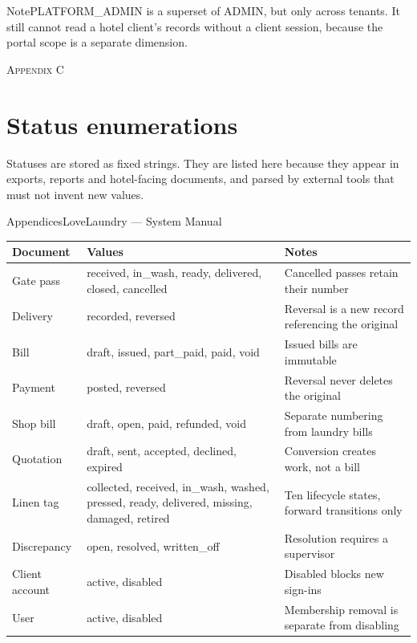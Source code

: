 \documentclass[11pt,a4paper,oneside]{book}
\begin{document}
\begin{notebox}NotePLATFORM\_ADMIN is a superset of ADMIN, but only across tenants. It still cannot read a hotel client's records without a client session, because the portal scope is a separate dimension.\end{notebox}
\textsc{\small\color{crimson}Appendix C}\par\medskip
\section*{Status enumerations}
Statuses are stored as fixed strings. They are listed here because they appear in exports, reports and hotel-facing documents, and parsed by external tools that must not invent new values.

AppendicesLoveLaundry — System Manual

\begin{center}\small
\begin{tabularx}{\linewidth}{|X|X|X|}
\hline
\rowcolor{lightgrey}
\textbf{Document} & \textbf{Values} & \textbf{Notes} \\ \hline
Gate pass & received, in\_wash, ready, delivered, closed, cancelled & Cancelled passes retain their number \\ \hline
Delivery & recorded, reversed & Reversal is a new record referencing the original \\ \hline
Bill & draft, issued, part\_paid, paid, void & Issued bills are immutable \\ \hline
Payment & posted, reversed & Reversal never deletes the original \\ \hline
Shop bill & draft, open, paid, refunded, void & Separate numbering from laundry bills \\ \hline
Quotation & draft, sent, accepted, declined, expired & Conversion creates work, not a bill \\ \hline
Linen tag & collected, received, in\_wash, washed, pressed, ready, delivered, missing, damaged, retired & Ten lifecycle states, forward transitions only \\ \hline
Discrepancy & open, resolved, written\_off & Resolution requires a supervisor \\ \hline
Client account & active, disabled & Disabled blocks new sign-ins \\ \hline
User & active, disabled & Membership removal is separate from disabling \\ \hline
\end{tabularx}
\end{center}
\end{document}
